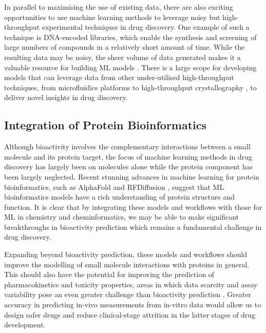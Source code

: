 In parallel to maximising the use of existing data, there are also exciting opportunities to use machine learning methods to leverage noisy but high-throughput experimental techniques in drug discovery. One example of such a technique is DNA-encoded libraries, which enable the synthesis and screening of large numbers of compounds in a relatively short amount of time. While the resulting data may be noisy, the sheer volume of data generated makes it a valuable resource for building ML models \cite{McCloskey2020DNALibrary, Blay20221DELTox, Lim2022DELCountML}. There is a large scope for developing models that can leverage data from other under-utilised high-throughput techniques, from microfluidics platforms \cite{Dittrich2006microfluidics, Skardal2016chip} to high-throughput crystallography \cite{Blundell2002HighThroughputCrystallography, Schiebel2016HighThroughput}, to deliver novel insights in drug discovery.

\subsection{Integration of Protein Bioinformatics}
Although bioactivity involves the complementary interactions between a small molecule and its protein target, the focus of machine learning methods in drug discovery has largely been on molecules alone while the protein component has been largely neglected. Recent stunning advances in machine learning for protein bioinformatics, such as AlphaFold \cite{Jumper2021AlphaFold} and RFDiffusion \cite{Watson2022RfDiffusion}, suggest that ML bioinformatics models have a rich understanding of protein structure and function. It is clear that by integrating these models and workflows with those for ML in chemistry and cheminformatics, we may be able to make significant breakthroughs in bioactivity prediction which remains a fundamental challenge in drug discovery.

Expanding beyond bioactivity prediction, these models and workflows should improve the modelling of small molecule interactions with proteins in general. This should also have the potential for improving the prediction of pharmacokinetics and toxicity properties, areas in which data scarcity and assay variability pose an even greater challenge than bioactivity prediction \cite{Bhhatarai2019ADMETox, Wenzel2019ADMETox, Goller2020BayerADMET, Obrezanova2022InVivo}. Greater accuracy in predicting in-vivo measurements from in-vitro data would allow us to design safer drugs and reduce clinical-stage attrition in the latter stages of drug development.

